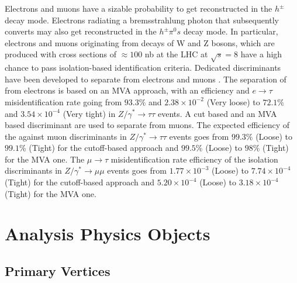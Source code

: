 Electrons and muons have a sizable probability to get reconstructed in the \ensuremath{h^{\pm}} decay mode. Electrons radiating a bremsstrahlung photon that subsequently converts may also get reconstructed in the \ensuremath{h^{\pm}\pi^{0}s} decay mode. In particular, electrons and muons originating from decays of W and Z bosons, which are produced with cross sections of \ensuremath{\approx100} nb at the LHC at \ensuremath{\sqrt{s} = 8} \tev have a high chance to pass isolation-based \hadtau identification criteria. Dedicated discriminants have been developed to separate \hadtau from electrons and muons \cite{Khachatryan:2015dfa}. The separation of \hadtau from electrons is based on an MVA approach, with an efficiency and \ensuremath{e\to \tau} misidentification rate going from \ensuremath{93.3\%} and \ensuremath{2.38 \times 10^{-2}} (Very loose) to \ensuremath{72.1\%} and \ensuremath{3.54 \times 10^{-4}} (Very tight) in \ensuremath{Z/\gamma^{*} \longrightarrow \tau\tau} events.
A cut based and an MVA based discriminant are used to separate \hadtau from muons. The expected efficiency of the \hadtau against muon discriminants in \ensuremath{Z/\gamma^{*} \longrightarrow \tau\tau} events goes from \ensuremath{99.3\%} (Loose) to \ensuremath{99.1}\% (Tight) for the cutoff-based approach and \ensuremath{99.5\%} (Loose) to \ensuremath{98\%} (Tight) for the MVA one. The \ensuremath{\mu \to \tau} misidentification rate efficiency of the \hadtau isolation discriminants in \ensuremath{Z/\gamma^{*} \longrightarrow \mu\mu} events goes from \ensuremath{1.77 \times 10^{-3}} (Loose) to \ensuremath{7.74 \times 10^{-4}} (Tight) for the cutoff-based approach and \ensuremath{5.20 \times 10^{-4}} (Loose) to \ensuremath{3.18 \times 10^{-4}} (Tight) for the MVA one.

\section {Analysis Physics Objects}

\subsection{Primary Vertices}
\label{subsec::objsel_vertex}


